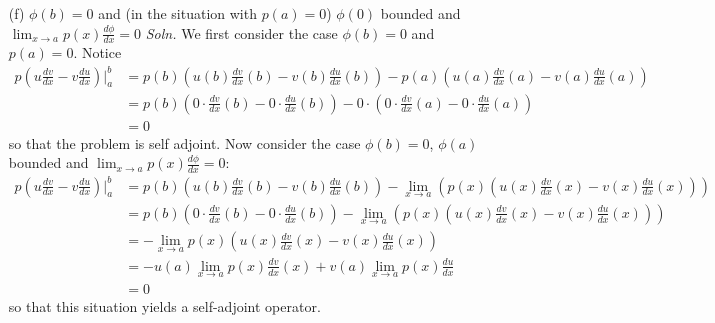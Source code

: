 \documentclass{article}
\begin{document}
\begin{itemize}
\begin{itemize}
        \item[(f)] $\phi(b) = 0$ and (in the situation with $p(a) = 0$) $\phi(0)$ bounded and $\lim_{x \to a}p(x)\frac{d\phi}{dx} = 0$
        \newline\newline
        \textit{Soln.} We first consider the case $\phi(b) = 0$ and $p(a) = 0$. Notice 
        \begin{align*}
            p\left(u\frac{dv}{dx} - v\frac{du}{dx}\right)\bigg|_a^b &= p(b)\left(u(b)\frac{dv}{dx}(b) - v(b)\frac{du}{dx}(b)\right) - p(a)\left(u(a)\frac{dv}{dx}(a) - v(a)\frac{du}{dx}(a)\right)\\
            &= p(b)\left(0\cdot\frac{dv}{dx}(b) - 0\cdot \frac{du}{dx}(b)\right) - 0\cdot \left(0\cdot \frac{dv}{dx}(a) - 0\cdot \frac{du}{dx}(a)\right)\\
            &= 0
        \end{align*}
        so that the problem is self adjoint.
        \newline
        Now consider the case $\phi(b) = 0$, $\phi(a)$ bounded and $\lim_{x \to a} p(x)\frac{d\phi}{dx} = 0$:
        \begin{align*}
            p\left(u\frac{dv}{dx} - v\frac{du}{dx}\right)\bigg|_a^b &= p(b)\left(u(b)\frac{dv}{dx}(b) - v(b)\frac{du}{dx}(b)\right) - \lim_{x \to a} \left(p(x)\left(u(x)\frac{dv}{dx}(x) - v(x)\frac{du}{dx}(x)\right)\right)\\
            &= p(b)\left(0\cdot\frac{dv}{dx}(b) - 0\cdot \frac{du}{dx}(b)\right) - \lim_{x \to a}\left(p(x)\left(u(x)\frac{dv}{dx}(x) - v(x)\frac{du}{dx}(x)\right)\right)\\
            &= -\lim_{x \to a} p(x)\left(u(x)\frac{dv}{dx}(x) - v(x)\frac{du}{dx}(x)\right)\\
            &= -u(a)\lim_{x \to a} p(x)\frac{dv}{dx}(x) + v(a)\lim_{x \to a }p(x)\frac{du}{dx} \tag{$\phi(a)$ bounded}\\
            &= 0
        \end{align*}
        so that this situation yields a self-adjoint operator.
    \end{itemize}
\end{itemize}
\end{document}
